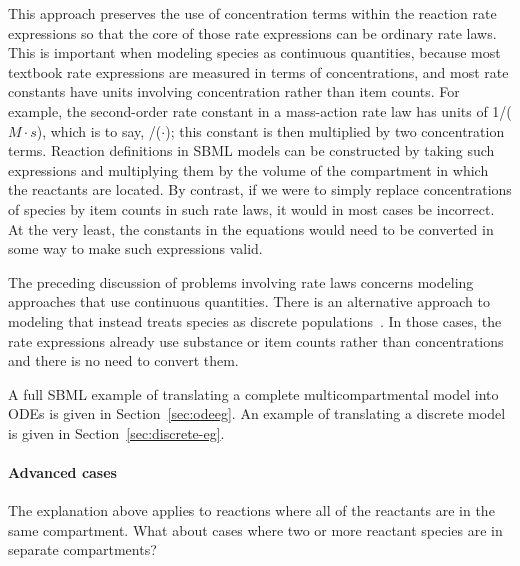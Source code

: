 This approach preserves the use of concentration terms within the
reaction rate expressions so that the core of those rate
expressions can be ordinary rate laws.  This is important when
modeling species as continuous quantities, because most textbook
rate expressions are measured in terms of concentrations, and most
rate constants have units involving concentration rather than item
counts.  For example, the second-order rate constant in a
mass-action rate law has units of 1/($M \cdot s$), which is to
say,
/($\cdot$);
this constant is then multiplied by two concentration terms.
Reaction definitions in SBML models can be constructed by taking
such expressions and multiplying them by the volume of the
compartment in which the reactants are located.  By contrast, if
we were to simply replace concentrations of species by item counts
in such rate laws, it would in most cases be incorrect.  At the
very least, the constants in the equations would need to be
converted in some way to make such expressions valid.

The preceding discussion of problems involving rate laws concerns
modeling approaches that use continuous quantities.  There is an
alternative approach to modeling that instead treats species as
discrete populations~\citep{wilkinson_2006}.  In those cases, the
rate expressions already use substance or item counts rather than
concentrations and there is no need to convert them.

A full SBML example of translating a complete multicompartmental
model into ODEs is given in Section~\ref{sec:odeeg}.  An example
of translating a discrete model is given in
Section~\ref{sec:discrete-eg}.


\paragraph{Advanced cases}

The explanation above applies to reactions where all of the
reactants are in the same compartment.  What about cases where two
or more reactant species are in separate compartments?

